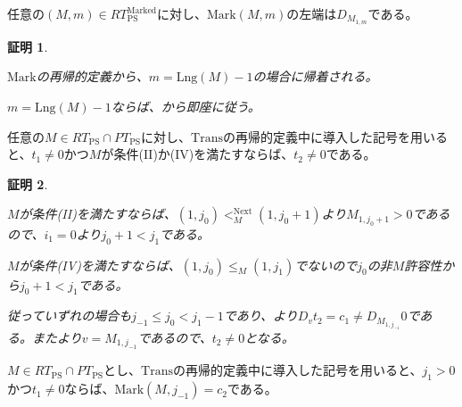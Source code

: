 \documentclass[dvipdfmx,uplatex]{jsarticle}
\theoremstyle{customnonumberbreakfortheorem}
\theoremstyle{customnonumberbreakforproof}
\newtheorem{hideableproof}{証明}
\begin{document}
\begin{corollary}\label{Markの左端の基本性質}
	任意の\((M,m) \in RT_{\textrm{PS}}^{\textrm{Marked}}\)に対し、\(\textrm{Mark}(M,m)\)の左端は\(D_{M_{1,m}}\)である。
\end{corollary}

\begin{hideableproof}
	\begin{indented}
		\item \(\textrm{Mark}\)の再帰的定義から、\(m = \textrm{Lng}(M) - 1\)の場合に帰着される。
		\item \(m = \textrm{Lng}(M) - 1\)ならば、から即座に従う。
	\end{indented}
\end{hideableproof}

\begin{corollary}\label{条件(II)か(IV)の下でt_2が0でないこと}
	任意の\(M \in RT_{\textrm{PS}} \cap PT_{\textrm{PS}}\)に対し、\(\textrm{Trans}\)の再帰的定義中に導入した記号を用いると、\(t_1 \neq 0\)かつ\(M\)が条件(II)か(IV)を満たすならば、\(t_2 \neq 0\)である。
\end{corollary}

\begin{hideableproof}
	\begin{indented}
		\item \(M\)が条件(II)を満たすならば、\((1,j_0) <_M^{\textrm{Next}} (1,j_0+1)\)より\(M_{1,j_0+1} > 0\)であるので、\(i_1 = 0\)より\(j_0+1 < j_1\)である。
		\item \(M\)が条件(IV)を満たすならば、\((1,j_0) \leq_M (1,j_1)\)でないので\(j_0\)の非\(M\)許容性から\(j_0+1 < j_1\)である。
		\item 従っていずれの場合も\(j_{-1} \leq j_0 < j_1-1\)であり、より\(D_v t_2 = c_1 \neq D_{M_{1,j_{-1}}} 0\)である。またより\(v = M_{1,j_{-1}}\)であるので、\(t_2 \neq 0\)となる。
	\end{indented}
\end{hideableproof}

\begin{proposition}\label{右端第2基点のMarkの基本性質}
	\(M \in RT_{\textrm{PS}} \cap PT_{\textrm{PS}}\)とし、\(\textrm{Trans}\)の再帰的定義中に導入した記号を用いると、\(j_1 > 0\)かつ\(t_1 \neq 0\)ならば、\(\textrm{Mark}(M,j_{-1}) = c_2\)である。
\end{proposition}
\end{document}
